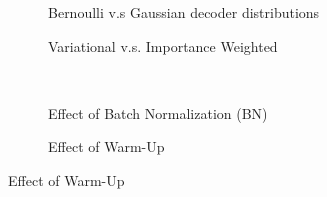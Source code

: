 \documentclass{article} %
\begin{document}
\begin{figure}
\captionsetup[subfigure]{justification=centering}
    \centering
     \begin{subfigure}[b]{0.45\textwidth}
    \resizebox{\linewidth}{!}{}
    \caption{Bernoulli v.s Gaussian decoder distributions}
    \label{fig:bergau}
    \end{subfigure}
    \hfill
    \begin{subfigure}[b]{0.45\textwidth}
    \resizebox{\linewidth}{!}{}
    \caption{Variational v.s. Importance Weighted}
    \label{fig:variw}
    \end{subfigure}\\[0.3in]
    \begin{subfigure}[b]{0.45\textwidth}
    \resizebox{\linewidth}{!}{}
    \caption{Effect of Batch Normalization (BN)}
    \label{fig:bncost}
    \end{subfigure}
    \hfill
    \begin{subfigure}[b]{0.45\textwidth}
    \resizebox{\linewidth}{!}{}
    \caption{Effect of Warm-Up}
    \label{fig:wucost}
    \end{subfigure}
%    
\end{figure}
\end{document}
